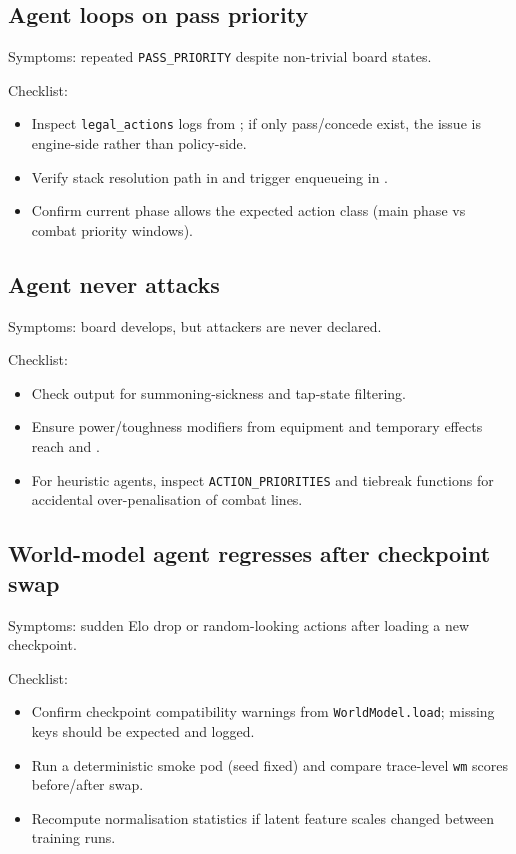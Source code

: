 \documentclass[11pt,a4paper]{article}
\begin{document}
\subsection{Agent loops on pass priority}
Symptoms: repeated \texttt{PASS\_PRIORITY} despite non-trivial board states.

Checklist:
\begin{itemize}[leftmargin=1.2em, itemsep=1pt]
      \item Inspect \texttt{legal\_actions} logs from ; if only pass/concede exist, the issue is engine-side rather than policy-side.
      \item Verify stack resolution path in  and trigger enqueueing in .
      \item Confirm current phase allows the expected action class (main phase vs combat priority windows).
\end{itemize}

\subsection{Agent never attacks}
Symptoms: board develops, but attackers are never declared.

Checklist:
\begin{itemize}[leftmargin=1.2em, itemsep=1pt]
      \item Check  output for summoning-sickness and tap-state filtering.
      \item Ensure power/toughness modifiers from equipment and temporary effects reach  and .
      \item For heuristic agents, inspect \texttt{ACTION\_PRIORITIES} and tiebreak functions for accidental over-penalisation of combat lines.
\end{itemize}

\subsection{World-model agent regresses after checkpoint swap}
Symptoms: sudden Elo drop or random-looking actions after loading a new checkpoint.

Checklist:
\begin{itemize}[leftmargin=1.2em, itemsep=1pt]
      \item Confirm checkpoint compatibility warnings from \texttt{WorldModel.load}; missing keys should be expected and logged.
      \item Run a deterministic smoke pod (seed fixed) and compare trace-level \texttt{wm} scores before/after swap.
      \item Recompute normalisation statistics if latent feature scales changed between training runs.
\end{itemize}
\end{document}
